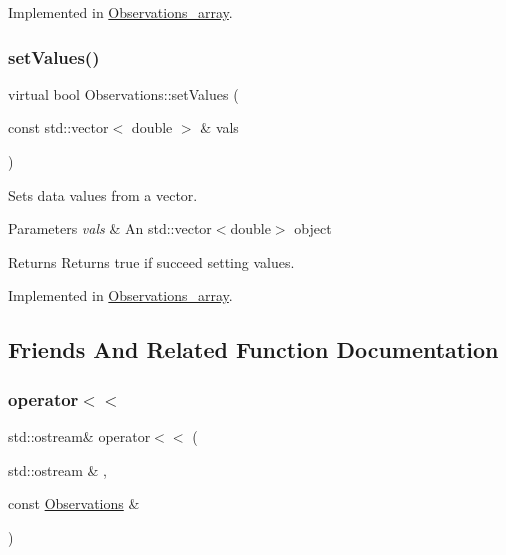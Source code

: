 Implemented in \mbox{\hyperlink{class_observations__array_a1708fe12a750cb68bb60782ab184605b}{Observations\+\_\+array}}.

\mbox{\label{class_observations_a58e9bcf10981845ad5bf89b34cacdbd7}} 
\subsubsection{\texorpdfstring{set\+Values()}{setValues()}}
{\footnotesize\ttfamily virtual bool Observations\+::set\+Values (\begin{DoxyParamCaption}\item[{const std\+::vector$<$ double $>$ \&}]{vals }\end{DoxyParamCaption})\hspace{0.3cm}{\ttfamily [pure virtual]}}

Sets data values from a vector.


\begin{DoxyParams}{Parameters}
{\em vals} & An std\+::vector$<$double$>$ object \\
\hline
\end{DoxyParams}
\begin{DoxyReturn}{Returns}
Returns true if succeed setting values. 
\end{DoxyReturn}


Implemented in \mbox{\hyperlink{class_observations__array_a59ee8d2a6b0d0158a3efa7c200c8ff43}{Observations\+\_\+array}}.



\subsection{Friends And Related Function Documentation}
\mbox{\label{class_observations_ad93ae2b52ac4bae27e3419d1545ee68f}} 
\subsubsection{\texorpdfstring{operator$<$$<$}{operator<<}}
{\footnotesize\ttfamily std\+::ostream\& operator$<$$<$ (\begin{DoxyParamCaption}\item[{std\+::ostream \&}]{,  }\item[{const \mbox{\hyperlink{class_observations}{Observations}} \&}]{ }\end{DoxyParamCaption})\hspace{0.3cm}{\ttfamily [friend]}}



